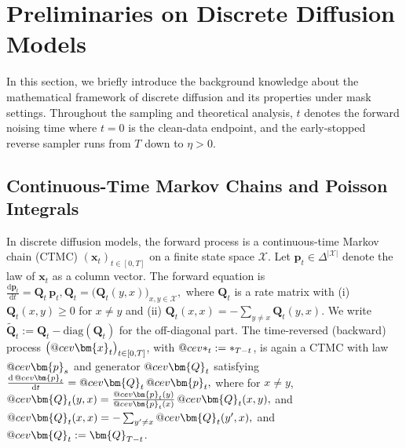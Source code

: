 \documentclass{article}
\makeatletter
\DeclareRobustCommand{\cev}[1]{%
  {\mathpalette\do@cev{#1}}%
}
\newcommand{\do@cev}[2]{%
  \vbox{\offinterlineskip
    \sbox\z@{$\m@th#1 x$}%
    \ialign{##\cr
\hidewidth\reflectbox{$\m@th#1\vec{}\mkern4mu$}\hidewidth\cr
      \noalign{\kern-\ht\z@}
      $\m@th#1#2$\cr
    }%
  }%
}
\def\vp{{\bm{p}}}
\def\vx{{\bm{x}}}
\def\mQ{{\bm{Q}}}
\makeatother
\begin{document}
\section{Preliminaries on Discrete Diffusion Models}
\label{sec:preliminaries}
In this section, we briefly introduce the background knowledge about the mathematical framework of discrete diffusion and its properties under mask settings. Throughout the sampling and theoretical analysis, \(t\) denotes the forward noising time where \(t=0\) is the clean-data endpoint, and the early-stopped reverse sampler runs from \(T\) down to \(\eta>0\).

\subsection{Continuous-Time Markov Chains and Poisson Integrals}

In discrete diffusion models, the forward process is a continuous-time Markov chain (CTMC) $(\vx_t)_{t\in[0,T]}$ on a finite state space $\mathcal{X}$. Let $\vp_t\in\Delta^{|\mathcal{X}|}$ denote the law of $\vx_t$ as a column vector. The forward equation is
$  \frac{\mathrm{d}\vp_t}{\mathrm{d}t}=\mQ_t\,\vp_t,
  \mQ_t=\bigl(\mQ_t(y,x)\bigr)_{x,y\in\mathcal{X}},
  $
where $\mQ_t$ is a rate matrix with (i) $\mQ_t(x,y)\ge 0$ for $x\neq y$ and (ii) $\mQ_t(x,x)=-\sum_{y\neq x}\mQ_t(y,x)$. We write $\widetilde \mQ_t:=\mQ_t-\mathrm{diag}(\mQ_t)$ for the off-diagonal part. 
%
The time-reversed (backward) process $\bigl(\cev{\vx}_t\bigr)_{t\in[0,T]}$, with $\cev{*}_t:=*_{T-t}$, is again a CTMC with law $\cev{\vp}_s$ and generator $\cev{\mQ}_t$ satisfying~\citep{kelly2011reversibility}
$  \frac{\mathrm{d}\,\cev{\vp}_t}{\mathrm{d}t}=\cev{\mQ}_t\,\cev{\vp}_t,$
where for $x\neq y$,
$  \cev \mQ_t(y,x)=\frac{\cev \vp_t(y)}{\cev \vp_t(x)}\,\cev \mQ_t(x,y),$ and $
  \cev \mQ_t(x,x)=-\sum_{y'\neq x}\cev \mQ_t(y',x),$
and $\cev{\mQ}_t:=\mQ_{T-t}$.
\end{document}
